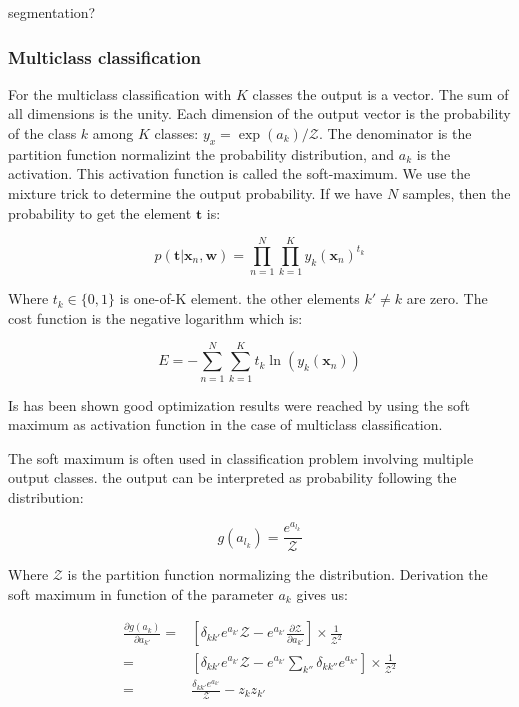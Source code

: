 \documentclass[final, paper=letter,5p,times,twocolumn]{elsarticle}
\begin{document}
segmentation?

\subsubsection{Multiclass classification}
\label{sec:MulticlassClassification}

For the multiclass classification with $K$ classes the output is a vector. The sum of all dimensions is the unity. Each dimension of the output vector is the probability of the class $k$ among $K$ classes: $y_{x} = \exp(a_{k}) / \mathcal{Z}$. The denominator is the partition function normalizint the probability distribution, and $a_{k}$ is the activation. This activation function is called the soft-maximum. We use the mixture trick to determine the output probability. If we have $N$ samples, then the probability to get the element $\bm{t}$ is:

\begin{equation}
p(\bm{t} | \bm{x}_{n}, \bm{w}) = \prod_{n=1}^{N}\prod_{k=1}^{K} y_{k}(\bm{x}_{n})^{t_{k}}
\end{equation}

Where $t_{k} \in \{0,1\}$ is one-of-K element. the other elements $k' \ne k$ are zero. The cost function is the negative logarithm which is:

\begin{equation}
E = - \sum_{n=1}^{N}\sum_{k=1}^{K} t_{k} \ln (y_{k}(\bm{x}_{n}))
\end{equation}

Is has been shown good optimization results were reached by using the soft maximum as activation function in the case of multiclass classification.

The soft maximum is often used in classification problem involving multiple output classes. the output can be interpreted as probability following the distribution:

\begin{equation}
  g(a_{l_{k}}) = \frac{e^{a_{l_{k}}}}{\mathcal{Z}}
  \label{soft_max}
\end{equation}

Where $\mathcal{Z}$ is the partition function normalizing the distribution. Derivation the soft maximum in function of the parameter $a_{k}$ gives us:

\begin{equation*}
  \begin{split}
    \frac{\partial g(a_{k})}{\partial a_{k'}} = & \left \lbrack \delta_{kk'} e^{a_{k'}} \mathcal{Z} - e^{a_{k'}}\frac{\partial \mathcal{Z}}{\partial a_{k'}} \right \rbrack \times \frac{1}{\mathcal{Z}^{2}}\\
    = & \left \lbrack \delta_{kk'} e^{a_{k'}} \mathcal{Z} - e^{a_{k'}} \sum_{k''} \delta_{kk''} e^{a_{k''}}  \right \rbrack \times \frac{1}{\mathcal{Z}^{2}}\\
    = & \frac{\delta_{kk'} e^{a_{k'}}}{\mathcal{Z}} - z_{k}z_{k'}\\
  \end{split}
\end{equation*}
\end{document}

